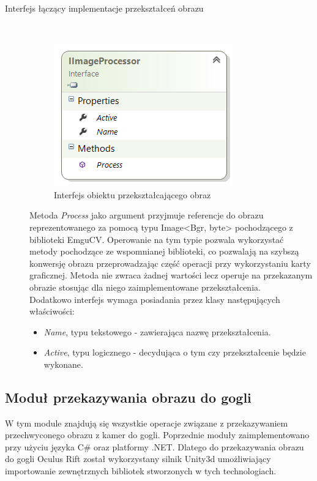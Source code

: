 \documentclass[a4paper,11pt,twoside]{report}
\theoremstyle{definition}
\begin{document}
\begin{description}
\item [Interfejs łączący implementacje przekształceń obrazu] \hfill \\

\begin{figure}[h]
\centering
\includegraphics[scale=0.9]{images/IImageProcessor}
\caption[Przekształcenie diagram diagram]{Interfejs obiektu przekształcającego obraz}
\end{figure}

Metoda \textit{Process} jako argument przyjmuje referencje do obrazu reprezentowanego za pomocą typu Image<Bgr, byte> pochodzącego z biblioteki EmguCV. Operowanie na tym typie pozwala wykorzystać metody pochodzące ze wspomnianej biblioteki, co pozwalają na szybszą konwersję obrazu przeprowadzając część operacji przy wykorzystaniu karty graficznej. Metoda nie zwraca żadnej wartości lecz operuje na przekazanym obrazie stosując dla niego zaimplementowane przekształcenia.  \\
Dodatkowo interfejs wymaga posiadania przez klasy następujących właściwości:
\begin{itemize}
\item  \textit{Name}, typu tekstowego - zawierająca nazwę przekształcenia.
\item \textit{Active}, typu logicznego -  decydująca o tym czy przekształcenie będzie wykonane.
\end{itemize}

\end{description}

\subsection{Moduł przekazywania obrazu do gogli}

W tym module znajdują się wszystkie operacje związane z przekazywaniem przechwyconego obrazu z kamer do gogli. Poprzednie moduły zaimplementowano przy użyciu języka C\# oraz  platformy .NET. Dlatego do przekazywania obrazu do gogli Oculus Rift został wykorzystany silnik Unity3d umożliwiający importowanie zewnętrznych bibliotek stworzonych w tych technologiach.
\end{document}
